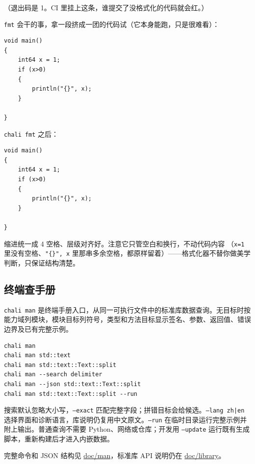 （退出码是 1。CI 里挂上这条，谁提交了没格式化的代码就会红。）

\texttt{fmt} 会干的事，拿一段挤成一团的代码试（它本身能跑，只是很难看）：

\par
\medskip
\begin{lstlisting}[style=chali]
void main()
{
    int64 x = 1;
    if (x>0)
    {
        println("{}", x);
    }

}
\end{lstlisting}
\par
\medskip

\texttt{chali fmt} 之后：

\par
\medskip
\begin{lstlisting}[style=chali]
void main()
{
    int64 x = 1;
    if (x>0)
    {
        println("{}", x);
    }

}
\end{lstlisting}
\par
\medskip

缩进统一成 4 空格、层级对齐好。注意它只管空白和换行，不动代码内容 （\texttt{x=\allowbreak{}1} 里没有空格、\texttt{"\{\}",\allowbreak{}    x} 里那串多余空格，都原样留着）——格式化器不替你做美学判断，只保证结构清楚。

\subsection*{终端查手册}

\texttt{chali man} 是终端手册入口，从同一可执行文件中的标准库数据查询。无目标时按能力域列模块，模块目标列符号，类型和方法目标显示签名、参数、返回值、错误边界及已有完整示例。

\par
\medskip
\begin{lstlisting}[style=sh]
chali man
chali man std::text
chali man std::text::Text::split
chali man --search delimiter
chali man --json std::text::Text::split
chali man std::text::Text::split --run
\end{lstlisting}
\par
\medskip

搜索默认忽略大小写，\texttt{--exact} 匹配完整字段；拼错目标会给候选。\texttt{--lang zh|en} 选择界面和诊断语言，库说明仍复用中文原文。\texttt{--run} 在临时目录运行完整示例并附上输出。普通查询不需要 Python、网络或仓库；开发用 \texttt{--update} 运行既有生成脚本，重新构建后才进入内嵌数据。

完整命令和 JSON 结构见 \href{https://gitee.com/rabbitc999/chali/blob/master/doc/man/README.md}{doc/man}，标准库 API 说明仍在 \href{https://gitee.com/rabbitc999/chali/blob/master/doc/library/README.md}{doc/library}。

